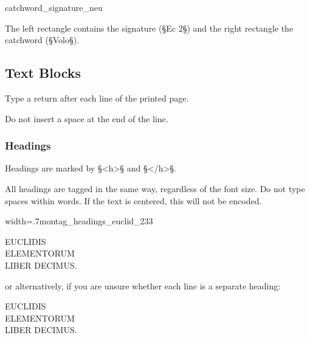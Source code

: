 \begin{sampleImage}{catchword_signature_neu}

\notTranscribed

The left rectangle contains the signature (§Ec 2§) and the right rectangle the catchword (§Volo§).
\end{sampleImage}


\tocspace
\subsection{Text Blocks}

\begin{mainrule}
Type a return after each line of the printed page.
\end{mainrule}

\begin{clarification}
Do not insert a space at the end of the line. 
\end{clarification}

\subsubsection{Headings}
\label{section headings}

\begin{mainrule}
Headings are marked by §<h>§ and §</h>§.
\end{mainrule}

\begin{clarification}
All headings are tagged in the same way, regardless of the font size. Do not type spaces within words. If the text is centered, this will not be encoded.
\end{clarification}

\begin{sampleImageSmall}{width=.7\linewidth}{montag_headings_euclid_233}
\begin{typeLatin}
EUCLIDIS \\
ELEMENTORUM \\
LIBER DECIMUS.
\end{typeLatin}
or alternatively, if you are unsure whether each line is a separate heading:
\begin{typeLatin}
EUCLIDIS \\
ELEMENTORUM \\
LIBER DECIMUS.
\end{typeLatin}
\end{sampleImageSmall}


